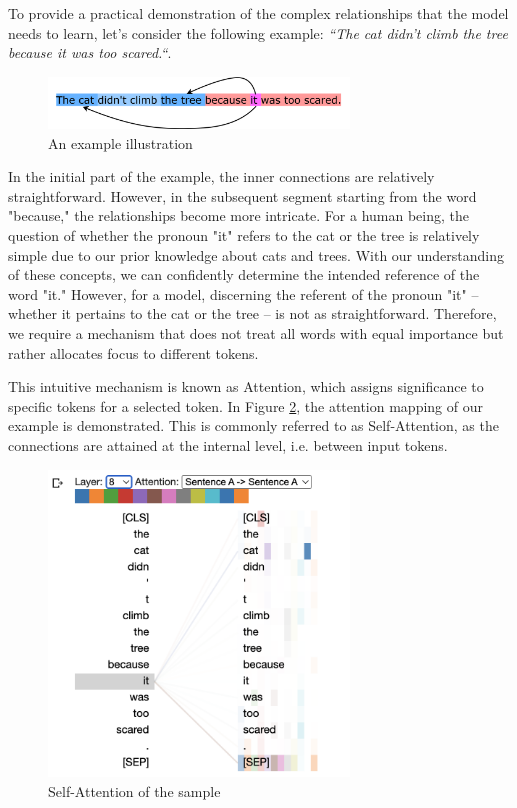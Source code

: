 To provide a practical demonstration of the complex relationships that the model needs to learn, let's consider the following example: \emph{``The cat didn't climb the tree because it was too scared.``}.
\begin{figure}[h]
    \centering
    \includegraphics[width=8cm]{pages/imgs/example.png}
    \caption{An example illustration}
    \label{fig:example}
\end{figure}
In the initial part of the example, the inner connections are relatively straightforward. However, in the subsequent segment starting from the word "because," the relationships become more intricate.
For a human being, the question of whether the pronoun "it" refers to the cat or the tree is relatively simple due to our prior knowledge about cats and trees. With our understanding of these concepts, we can confidently determine the intended reference of the word "it." 
However, for a model, discerning the referent of the pronoun "it" -- whether it pertains to the cat or the tree -- is not as straightforward. Therefore, we require a mechanism that does not treat all words with equal importance but rather allocates focus to different tokens.

This intuitive mechanism is known as Attention, which assigns significance to specific tokens for a selected token. In Figure \ref{fig:att_self_sample}, the attention mapping of our example is demonstrated. This is commonly referred to as Self-Attention, as the connections are attained at the internal level, i.e. between input tokens.

\begin{figure}[h]
    \centering
    \includegraphics[width=8cm]{pages/imgs/att_self_sample.png}
    \caption{Self-Attention of the sample}
    \label{fig:att_self_sample}
\end{figure}

